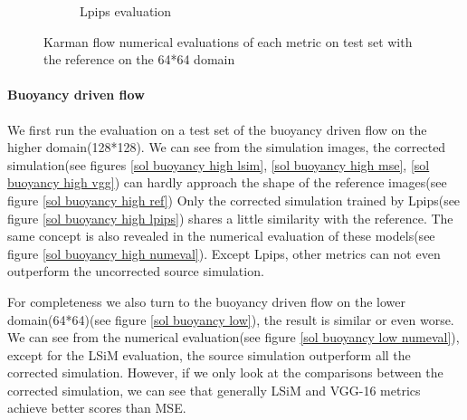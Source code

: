 \documentclass[a4paper,12pt,twoside]{report}
\begin{document}
\begin{figure}
\begin{subfigure}{0.32\textwidth}
		\caption{Lpips evaluation}
	\end{subfigure}
	\caption{Karman flow numerical evaluations of each metric on test set with the reference on the 64*64 domain}
	\label{sol karman low numeval}
\end{figure}

\paragraph{Buoyancy driven flow}
We first run the evaluation on a test set of the buoyancy driven flow on the higher domain(128*128). We can see from the simulation images, the corrected simulation(see figures \ref{sol buoyancy high lsim}, \ref{sol buoyancy high mse}, \ref{sol buoyancy high vgg}) can hardly approach the shape of the reference images(see figure \ref{sol buoyancy high ref}) Only the corrected simulation trained by Lpips(see figure \ref{sol buoyancy high lpips}) shares a little similarity with the reference. The same concept is also revealed in the numerical evaluation of these models(see figure \ref{sol buoyancy high numeval}). Except Lpips, other metrics can not even outperform the uncorrected source simulation. 

For completeness we also turn to the buoyancy driven flow on the lower domain(64*64)(see figure \ref{sol buoyancy low}), the result is similar or even worse. We can see from the numerical evaluation(see figure \ref{sol buoyancy low numeval}), except for the LSiM evaluation, the source simulation outperform all the corrected simulation. However, if we only look at the comparisons between the corrected simulation, we can see that generally LSiM and VGG-16 metrics achieve better scores than MSE.
\end{document}

